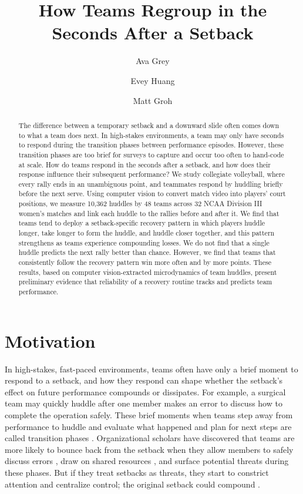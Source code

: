 \documentclass[12pt]{article}          %
\title{How Teams Regroup in the Seconds After a Setback}
\author{Ava Grey \and Evey Huang \and Matt Groh}
\date{}
\begin{document}
\maketitle
\begin{abstract}
The difference between a temporary setback and a downward slide often comes down to what a team does next. In high-stakes environments, a team may only have seconds to respond during the transition phases between performance episodes. However, these transition phases are too brief for surveys to capture and occur too often to hand-code at scale. How do teams respond in the seconds after a setback, and how does their response influence their subsequent performance? We study collegiate volleyball, where every rally ends in an unambiguous point, and teammates respond by huddling briefly before the next serve. Using computer vision to convert match video into players' court positions, we measure 10,362 huddles by 48 teams across 32 NCAA Division III women's matches and link each huddle to the rallies before and after it. We find that teams tend to deploy a setback-specific recovery pattern in which players huddle longer, take longer to form the huddle, and huddle closer together, and this pattern strengthens as teams experience compounding losses.  We do not find that a single huddle predicts the next rally better than chance. However, we find that teams that consistently follow the recovery pattern win more often and by more points. These results, based on computer vision-extracted microdynamics of team huddles, present preliminary evidence that reliability of a recovery routine tracks and predicts team performance.
\end{abstract}

\section{Motivation}

In high-stakes, fast-paced environments, teams often have only a brief moment to respond to a setback, and how they respond can shape whether the setback’s effect on future performance compounds or dissipates. For example, a surgical team may quickly huddle after one member makes an error to discuss how to complete the operation safely. These brief moments when teams step away from performance to huddle and evaluate what happened and plan for next steps are called transition phases \citep{marks2001temporally}.  Organizational scholars have discovered that teams are more likely to bounce back from the setback when they allow members to safely discuss errors \citep{edmondson1999}, draw on shared resources \citep{stoverink2020}, and surface potential threats \citep{goldenhar2013huddling} during these phases.  But if they treat setbacks as threats, they start to constrict attention and centralize
control; the original setback could compound \citep{staw1981}. 
\end{document}
